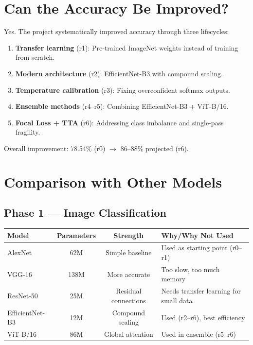 \documentclass[11pt]{article}
\begin{document}
\section{Can the Accuracy Be Improved?}

Yes. The project systematically improved accuracy through three lifecycles:

\begin{enumerate}
    \item \textbf{Transfer learning} (r1): Pre-trained ImageNet weights instead of training from scratch.
    \item \textbf{Modern architecture} (r2): EfficientNet-B3 with compound scaling.
    \item \textbf{Temperature calibration} (r3): Fixing overconfident softmax outputs.
    \item \textbf{Ensemble methods} (r4--r5): Combining EfficientNet-B3 + ViT-B/16.
    \item \textbf{Focal Loss + TTA} (r6): Addressing class imbalance and single-pass fragility.
\end{enumerate}

Overall improvement: 78.54\% (r0) $\to$ 86--88\% projected (r6).

\section{Comparison with Other Models}

\subsection{Phase 1 --- Image Classification}

\begin{table}[H]
    \centering
    \renewcommand{\arraystretch}{1.2}
    \begin{tabular}{lccl}
        \toprule
        \textbf{Model} & \textbf{Parameters} & \textbf{Strength} & \textbf{Why/Why Not Used} \\
        \midrule
        AlexNet & 62M & Simple baseline & Used as starting point (r0--r1) \\
        VGG-16 & 138M & More accurate & Too slow, too much memory \\
        ResNet-50 & 25M & Residual connections & Needs transfer learning for small data \\
        EfficientNet-B3 & 12M & Compound scaling & Used (r2--r6), best efficiency \\
        ViT-B/16 & 86M & Global attention & Used in ensemble (r5--r6) \\
        \bottomrule
    \end{tabular}
\end{table}
\end{document}
